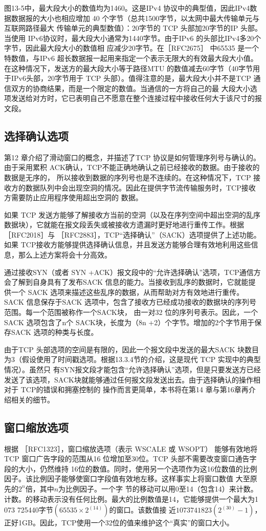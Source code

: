 图13-5中，最大段大小的数值均为1460。这是IPv4 协议中的典型值，因此IPv4数据数据报的大小也相应增加 40 个字节（总共1500字节，以太网中最大传输单元与互联网路径最大
传输单元的典型数值）：20字节的 TCP 头部加20字节的IP 头部。当使用 IPv6协议时，最大段大小通常为1440字节。由于IPv6 的头部比IPv4多20个字节，因此最大段大小的数值相
应减少20字节。在［RFC2675］ 中65535 是一个特数值，与IPv6 超长数据报一起用来指定一个表示无限大的有效最大段大小值。在这种情况下，发送方的最大段大小等于路径MTU
的数值减去60字节（40字节用于IPv6头部，20字节用于 TCP 头部）。值得注意的是，最大段大小并不是TCP 通信双方的协商结果，而是一个限定的数值。当通信的一方将自己的最
大段大小选项发送给对方时，它已表明自己不愿意在整个连接过程中接收任何大于该尺寸的报文段。

\subsection{选择确认选项}
第12 章介绍了滑动窗口的概念，并描述了TCP 协议是如何管理序列号与确认的。由于采用累积 ACK确认，TCP不能正确地确认之前已经接收的数据。由于接收的数据是无序的，
所以接收到数据的序列号也是不连续的。在这种情况下，TCP 接收方的数据队列中会出现空洞的情况。因此在提供字节流传输服务时，TCP接收方需要防止应用程序使用超出空洞的
数据。

如果 TCP 发送方能够了解接收方当前的空洞（以及在序列空间中超出空洞的乱序数据块），它就能在报文段丢失或被接收方遗漏时更好地进行重传工作。根据［RFC2018］与
［RFC2883］，TCP“选择确认”（SACK）选项提供了上述功能。如果 TCP接收方能够提供选择确认信息，并且发送方能够合理有效地利用这些信息，那么上述方案将会十分高效。

通过接收SYN（或者 SYN +ACK）报文段中的“允许选择确认”选项，TCP通信方会了解到自身具有了发布SACK 信息的能力。当接收到乱序的数据时，它就能提供一个 SACK
选项来描述这些乱序的数据，从而帮助对方有效地进行重传。SACK 信息保存于SACK 选项中，包含了接收方已经成功接收的数据块的序列号范围。每一个范围被称作一个SACK块，
由一对32 位的序列号表示。因此，一个 SACK 选项包含了n个 SACK块，长度为（8n +2）个字节。增加的2个字节用于保存SACK 选项的种类与长度。

由于TCP 头部选项的空间是有限的，因此一个报文段中发送的最大SACK 块数目为3（假设使用了时间戳选项。根据13.3.4节的介绍，这是现代 TCP 实现中的典型情况）。虽然只
有SYN报文段才能包含“允许选择确认”选项，但是只要发送方已经发送了该选项，SACK块就能够通过任何报文段发送出去。由于选择确认的操作相对于 TCP的错误和拥塞控制的
操作而言更简单，本书将在第14 章与第16章再介绍相关的细节。
\subsection{窗口缩放选项}
根据 ［RFC1323］，窗口缩放选项（表示 WSCALE 或 WSOPT） 能够有效地将 TCP 窗口广告字段的范围从16 位增加至30位。TCP 头部不需要改变窗口通告字段的大小，仍然维持
16位的数值。同时，使用另一个选项作为这16位数值的比例因子。该比例因子能够使窗口字段值有效地左移。这样事实上将窗口数值 大至原先的$2^n$倍，其中$n$为比例因子。一个字
节的移动可以用0至14（包含14）来计数。计数。的移动表示没有任何比例。最大的比例数值是14，它能够提供一个最大为1 073 725440字节$(65535 ×2^(14))$的窗口。该数值接
近$1073 741 823(2^(30)-1)$，正好1GB。因此，TCP使用一个32位的值来维护这个“真实”的窗口大小。

